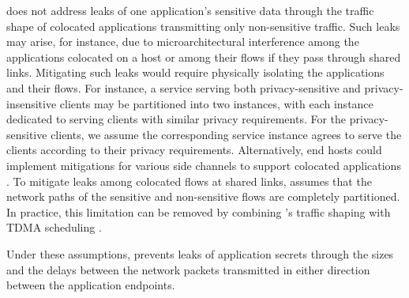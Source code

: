 {\sys} does not address leaks of one application's sensitive data through the traffic shape of colocated applications transmitting only non-sensitive traffic.
Such leaks may arise, for instance, due to microarchitectural interference among the applications colocated on a host or among their flows if they pass through shared links.
Mitigating such leaks would require physically isolating the
applications and their flows.
For instance, a service serving both privacy-sensitive and privacy-insensitive clients may be partitioned into two instances, with each instance dedicated to serving clients with similar privacy requirements.
For the privacy-sensitive clients, we assume the corresponding service instance agrees to serve the clients according to their privacy requirements. 
Alternatively, end hosts could implement mitigations for various side channels to support colocated applications \cite{mehta2022pacer, page05partitionedcache, shi2011limiting, kim2012stealthmem, varadarajan2014scheduler, braun2015robust}. 
To mitigate leaks among colocated flows at shared links, {\sys} assumes that the network paths of the sensitive and non-sensitive flows are completely partitioned.
In practice, this limitation can be removed by combining {\sys}’s traffic shaping with TDMA scheduling \cite{beams2021ifs, vattikonda2012tdma}.


Under these assumptions, {\sys} prevents leaks of application secrets through the sizes and the delays between the network packets transmitted in either direction between the application endpoints.

